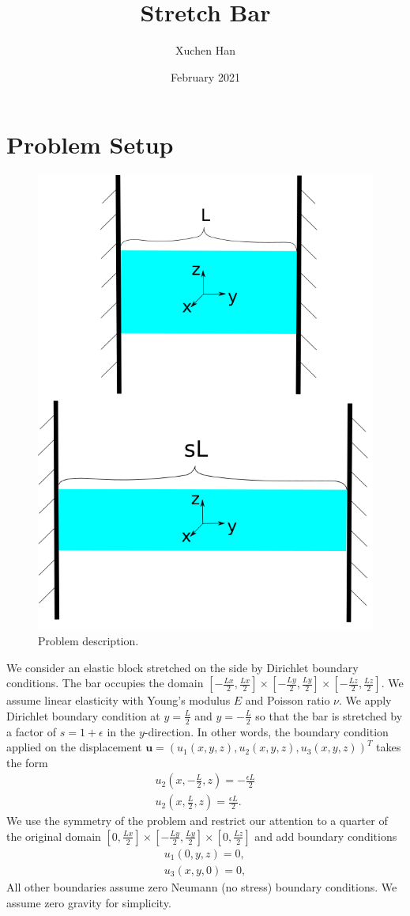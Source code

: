 \documentclass[a4paper]{article}
\title{Stretch Bar}
\author{Xuchen Han }
\date{February 2021}
\newcommand{\mb}[1]{{\mathbf{#1}}}
\newcommand{\uu}{\mb{u}}
\begin{document}
\maketitle
\section{Problem Setup}

\begin{figure}[!h]
  \centering
  \includegraphics[width=0.5\columnwidth]{stretch_bar.png}
  \caption{\label{fig:problem}
    Problem description.}
\end{figure}

We consider an elastic block stretched on the side by Dirichlet boundary
conditions. The bar occupies the domain $[-\frac{Lx}{2}, \frac{Lx}{2}]
\times [-\frac{Ly}{2}, \frac{Ly}{2}] \times [-\frac{Lz}{2}, \frac{Lz}{2}]$.
We assume linear elasticity with Young's modulus $E$ and Poisson ratio $\nu$.
We apply Dirichlet boundary condition at $y = \frac{L}{2}$ and
$y = -\frac{L}{2}$ so that the bar is stretched by a factor of $s = 1+\epsilon$
in the $y$-direction. In other words, the boundary condition applied on the
displacement $\uu = (u_1(x,y,z), u_2(x,y,z), u_3(x,y,z))^T$ takes the form
\begin{align*}
  u_2(x,-\frac{L}{2},z) = -\frac{\epsilon L}{2} \\
  u_2(x,\frac{L}{2},z) = \frac{\epsilon L}{2}.
\end{align*}
We use the symmetry of the problem and restrict our attention to a quarter of
the original domain $[0, \frac{Lx}{2}] \times [-\frac{Ly}{2}, \frac{Ly}{2}]
\times [0, \frac{Lz}{2}]$ and add boundary conditions
\begin{align*}
  u_1(0,y,z) = 0, \\
  u_3(x,y,0) = 0,
\end{align*}
All other boundaries assume zero Neumann (no stress) boundary conditions.
We assume zero gravity for simplicity.
\end{document}
